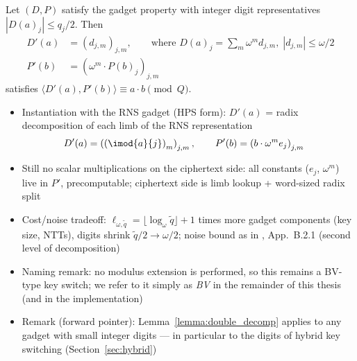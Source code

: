 {    \begin{lemma}
        \label{lemma:double_decomp}
        Let $(D, P)$ satisfy the gadget property with integer digit representatives
        $|D(a)_j| \le q_j/2$. Then
        \begin{align*}
            D'(a) &= \left(d_{j,m}\right)_{j,m},
            \qquad \text{where } D(a)_j = \sum_m \omega^m d_{j,m},\; |d_{j,m}| \le \omega/2 \\
            P'(b) &= \left(\omega^m \cdot P(b)_j\right)_{j,m}
        \end{align*}
        satisfies $\langle D'(a), P'(b)\rangle \equiv a\cdot b \pmod{Q}$.
    \end{lemma}
    
    \begin{itemize}
        \item Instantiation with the RNS gadget (HPS form): $D'(a)$ = radix decomposition
              of each limb of the RNS representation
              \begin{align*}
                  D'(a) &= \left( \left(\imod{a}{j}\right)_m \right)_{j,m}, \qquad
                  P'(b) = \left( b \cdot \omega^m e_j \right)_{j,m}
              \end{align*}
        \item Still no scalar multiplications on the ciphertext side: all constants
              ($e_j$, $\omega^m$) live in $P'$, precomputable; ciphertext side is limb
              lookup + word-sized radix split
        \item Cost/noise tradeoff: $\ell_{\omega,\tilde{q}} = \lfloor\log_\omega \tilde{q}\rfloor + 1$
              times more gadget components (key size, NTTs), digits shrink
              $\tilde{q}/2 \to \omega/2$; noise bound as in \cite{cryptoeprint:2021/204},
              App.~B.2.1 (second level of decomposition)
        \item Naming remark: no modulus extension is performed, so this remains a BV-type
              key switch; we refer to it simply as \emph{BV} in the remainder of this
              thesis (and in the implementation)
        \item Remark (forward pointer): Lemma~\ref{lemma:double_decomp} applies to any
              gadget with small integer digits --- in particular to the digits of hybrid
              key switching (Section~\ref{sec:hybrid})
    \end{itemize}
}\fi


